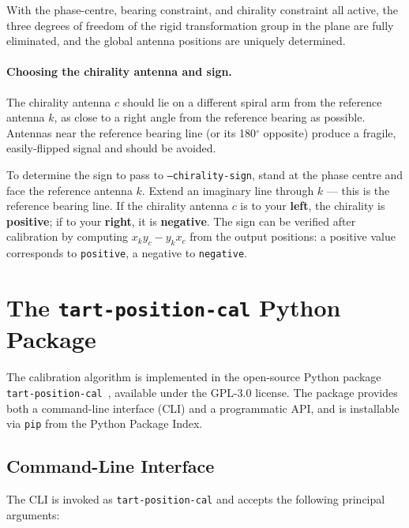 \documentclass[twocolumn, a4paper,10pt]{article}
\begin{document}
With the phase-centre, bearing constraint, and chirality constraint all active, the three degrees of freedom of the rigid transformation group in the plane are fully eliminated, and the global antenna positions are uniquely determined.

\paragraph{Choosing the chirality antenna and sign.}
The chirality antenna $c$ should lie on a different spiral arm from the reference antenna $k$, as close to a right angle from the reference bearing as possible.  Antennas near the reference bearing line (or its 180$^\circ$ opposite) produce a fragile, easily-flipped signal and should be avoided.

To determine the sign to pass to \texttt{--chirality-sign}, stand at the phase centre and face the reference antenna $k$.  Extend an imaginary line through $k$ --- this is the reference bearing line.  If the chirality antenna $c$ is to your \textbf{left}, the chirality is \textbf{positive}; if to your \textbf{right}, it is \textbf{negative}.  The sign can be verified after calibration by computing $x_k y_c - y_k x_c$ from the output positions: a positive value corresponds to \texttt{positive}, a negative to \texttt{negative}.

\section{The \texttt{tart-position-cal} Python Package}
\label{sec:software}

The calibration algorithm is implemented in the open-source Python package \texttt{tart-position-cal}~\cite{moltento2026tartpositioncal}, available under the GPL-3.0 license. The package provides both a command-line interface (CLI) and a programmatic API, and is installable via \texttt{pip} from the Python Package Index.

\subsection{Command-Line Interface}

The CLI is invoked as \texttt{tart-position-cal} and accepts the following principal arguments:
\end{document}
